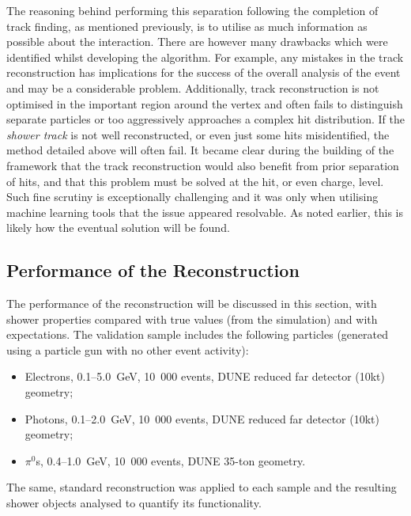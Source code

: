 The reasoning behind performing this separation following the completion of track finding, as mentioned previously, is to utilise as much information as possible about the interaction.  There are however many drawbacks which were identified whilst developing the algorithm.  For example, any mistakes in the track reconstruction has implications for the success of the overall analysis of the event and may be a considerable problem.  Additionally, track reconstruction is not optimised in the important region around the vertex and often fails to distinguish separate particles or too aggressively approaches a complex hit distribution.  If the \textit{shower track} is not well reconstructed, or even just some hits misidentified, the method detailed above will often fail.  It became clear during the building of the framework that the track reconstruction would also benefit from prior separation of hits, and that this problem must be solved at the hit, or even charge, level.  Such fine scrutiny is exceptionally challenging and it was only when utilising machine learning tools that the issue appeared resolvable.  As noted earlier, this is likely how the eventual solution will be found.

\subsection{Performance of the Reconstruction}\label{sec:ReconstructionPerformance}

The performance of the reconstruction will be discussed in this section, with shower properties compared with true values (from the simulation) and with expectations.  The validation sample includes the following particles (generated using a particle gun with no other event activity):
\begin{itemize}
  \item Electrons, 0.1--5.0~GeV, 10~000 events, DUNE reduced far detector (10kt) geometry;
  \item Photons, 0.1--2.0~GeV, 10~000 events, DUNE reduced far detector (10kt) geometry;
  \item $\pi^0$s, 0.4--1.0~GeV, 10~000 events, DUNE 35-ton geometry.
\end{itemize}
The same, standard reconstruction was applied to each sample and the resulting shower objects analysed to quantify its functionality.

